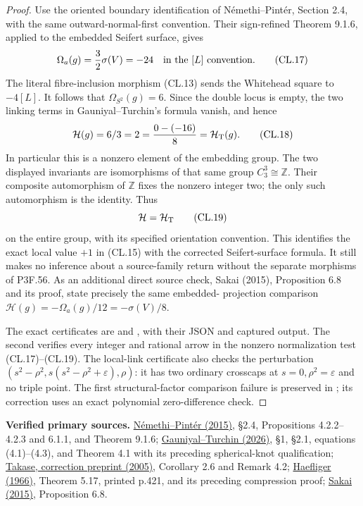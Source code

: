 \begin{proof}
Use the oriented boundary identification of Némethi--Pintér, Section
2.4, with the same outward-normal-first convention. Their sign-refined
Theorem 9.1.6, applied to the embedded Seifert surface, gives
\[
                 \Omega_a(g)=\frac32\sigma(V)=-24
                         \quad\hbox{in the }[L]\hbox{ convention}.
                                                               \tag{CL.17}
\]
The literal fibre-inclusion morphism (CL.13) sends the Whitehead
square to \(-4[L]\). It follows that
\(\Omega_{S^2}(g)=6\). Since the double locus is empty, the two
linking terms in Gauniyal--Turchin's formula vanish, and hence
\[
                  \mathcal H(g)=6/3=2
                    =\frac{0-(-16)}8=\mathcal H_{\rm T}(g).
                                                               \tag{CL.18}
\]
In particular this is a nonzero element of the embedding group.
The two displayed invariants are isomorphisms of that same group
\(C_3^3\cong\mathbb Z\). Their composite automorphism of
\(\mathbb Z\) fixes the nonzero integer two; the only such
automorphism is the identity. Thus
\[
                           \mathcal H=\mathcal H_{\rm T}
                                                               \tag{CL.19}
\]
on the entire group, with its specified orientation convention.
This identifies the exact local value \(+1\) in (CL.15) with
the corrected Seifert-surface formula. It still makes no inference
about a source-family return without the separate morphisms of
P3F.56. As an additional direct source check, Sakai (2015),
Proposition 6.8 and its proof, state precisely the same embedded-
projection comparison \(\mathcal H(g)=-\Omega_a(g)/12
=-\sigma(V)/8\).

The exact certificates are  and
, with their JSON and
captured output. The second verifies every integer and rational arrow
in the nonzero normalization test (CL.17)--(CL.19). The local-link
certificate also checks the perturbation
\((s^2-\rho^2,s(s^2-\rho^2+\varepsilon),\rho)\): it has two ordinary
crosscaps at \(s=0,\rho^2=\varepsilon\) and no triple point.
The first structural-factor comparison failure is preserved in
; its correction uses an exact polynomial
zero-difference check.
\end{proof}
\par\medskip\noindent\textbf{Verified primary sources.} \href{https://doi.org/10.4171/CMH/363}{N\'emethi--Pint\'er (2015)}, \S2.4, Propositions 4.2.2--4.2.3 and 6.1.1, and Theorem 9.1.6; \href{https://doi.org/10.1017/S0013091526101485}{Gauniyal--Turchin (2026)}, \S1, \S2.1, equations (4.1)--(4.3), and Theorem 4.1 with its preceding spherical-knot qualification; \href{https://arxiv.org/abs/math/0506356}{Takase, correction preprint (2005)}, Corollary 2.6 and Remark 4.2; \href{https://www.maths.ed.ac.uk/~v1ranick/tda/haefliger.pdf}{Haefliger (1966)}, Theorem 5.17, printed p.421, and its preceding compression proof; \href{https://doi.org/10.4310/HHA.2015.v17.n2.a15}{Sakai (2015)}, Proposition 6.8.
